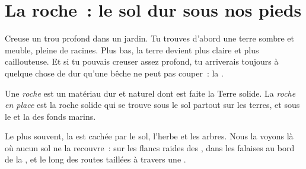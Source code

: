 \section{La roche~: le sol dur sous nos pieds}

Creuse un trou profond dans un jardin. Tu trouves d'abord une terre sombre
et meuble, pleine de racines. Plus bas, la terre devient plus claire et
plus caillouteuse. Et si tu pouvais creuser assez profond, tu arriverais
toujours à quelque chose de dur qu'une bêche ne peut pas couper~: la .

\begin{definition}\label{def:g3:stones-pebbles-sand:rock}
Une \emph{roche} est un matériau dur et naturel dont est faite
la Terre solide. La \emph{roche en place} est la roche
solide qui se trouve sous le sol partout sur les terres, et sous le 
et la  des fonds marins.
\end{definition}

Le plus souvent, la  est cachée par le sol, l'herbe et les
arbres. Nous la voyons là où aucun sol ne la recouvre~: sur les flancs
raides des , dans les falaises au bord de la , et le long des
routes taillées à travers une .

